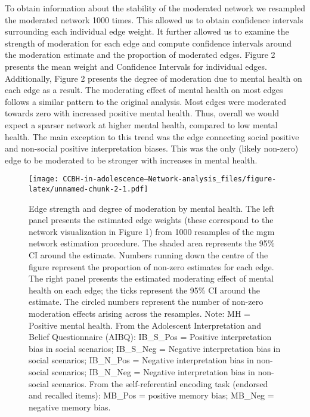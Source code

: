 \documentclass[
  english,
  man]{apa6}
\begin{document}
To obtain information about the stability of the moderated network we resampled the moderated network 1000 times. This allowed us to obtain confidence intervals surrounding each individual edge weight. It further allowed us to examine the strength of moderation for each edge and compute confidence intervals around the moderation estimate and the proportion of moderated edges. Figure 2 presents the mean weight and Confidence Intervals for individual edges. Additionally, Figure 2 presents the degree of moderation due to mental health on each edge as a result. The moderating effect of mental health on most edges follows a similar pattern to the original analysis. Most edges were moderated towards zero with increased positive mental health. Thus, overall we would expect a sparser network at higher mental health, compared to low mental health. The main exception to this trend was the edge connecting social positive and non-social positive interpretation biases. This was the only (likely non-zero) edge to be moderated to be stronger with increases in mental health.

\begin{figure}
\centering
\texttt{[image: CCBH-in-adolescence---Network-analysis\_files/figure-latex/unnamed-chunk-2-1.pdf]}
\caption{\label{fig:unnamed-chunk-2}Edge strength and degree of moderation by mental health. The left panel presents the estimated edge weights (these correspond to the network visualization in Figure 1) from 1000 resamples of the mgm network estimation procedure. The shaded area represents the 95\% CI around the estimate. Numbers running down the centre of the figure represent the proportion of non-zero estimates for each edge. The right panel presents the estimated moderating effect of mental health on each edge; the ticks represent the 95\% CI around the estimate. The circled numbers represent the number of non-zero moderation effects arising across the resamples. Note: MH = Positive mental health. From the Adolescent Interpretation and Belief Questionnaire (AIBQ): IB\_S\_Pos = Positive interpretation bias in social scenarios; IB\_S\_Neg = Negative interpretation bias in social scenarios; IB\_N\_Pos = Negative interpretation bias in non-social scenarios; IB\_N\_Neg = Negative interpretation bias in non-social scenarios. From the self-referential encoding task (endorsed and recalled items): MB\_Pos = positive memory bias; MB\_Neg = negative memory bias.}
\end{figure}
\end{document}
